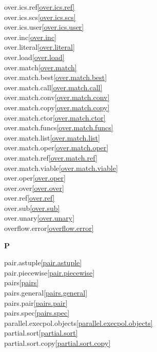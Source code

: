 \begin{multicols}{2}
over.ics.ref\quad\ref{over.ics.ref}\\
over.ics.scs\quad\ref{over.ics.scs}\\
over.ics.user\quad\ref{over.ics.user}\\
over.inc\quad\ref{over.inc}\\
over.literal\quad\ref{over.literal}\\
over.load\quad\ref{over.load}\\
over.match\quad\ref{over.match}\\
over.match.best\quad\ref{over.match.best}\\
over.match.call\quad\ref{over.match.call}\\
over.match.conv\quad\ref{over.match.conv}\\
over.match.copy\quad\ref{over.match.copy}\\
over.match.ctor\quad\ref{over.match.ctor}\\
over.match.funcs\quad\ref{over.match.funcs}\\
over.match.list\quad\ref{over.match.list}\\
over.match.oper\quad\ref{over.match.oper}\\
over.match.ref\quad\ref{over.match.ref}\\
over.match.viable\quad\ref{over.match.viable}\\
over.oper\quad\ref{over.oper}\\
over.over\quad\ref{over.over}\\
over.ref\quad\ref{over.ref}\\
over.sub\quad\ref{over.sub}\\
over.unary\quad\ref{over.unary}\\
overflow.error\quad\ref{overflow.error}\\
\par \textbf{P}\par
pair.astuple\quad\ref{pair.astuple}\\
pair.piecewise\quad\ref{pair.piecewise}\\
pairs\quad\ref{pairs}\\
pairs.general\quad\ref{pairs.general}\\
pairs.pair\quad\ref{pairs.pair}\\
pairs.spec\quad\ref{pairs.spec}\\
parallel.execpol.objects\quad\ref{parallel.execpol.objects}\\
partial.sort\quad\ref{partial.sort}\\
partial.sort.copy\quad\ref{partial.sort.copy}\\

\end{multicols}
